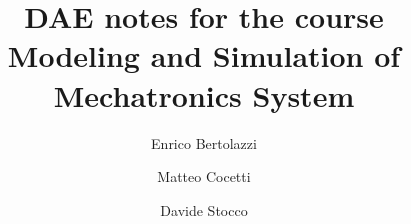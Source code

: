 \documentclass[11pt,a4paper,twoside,openany]{book}
\begin{document}
	\frontmatter

    \title{DAE notes for the course\\[1em] Modeling and Simulation of Mechatronics System}
    \author{Enrico Bertolazzi\and Matteo Cocetti\and Davide Stocco}
    \date{}
    \maketitle

	\tableofcontents
	\cleardoublepage
	
	\mainmatter
	
	
	
	
	
	\appendix
	
			
	\backmatter
	
\end{document}
